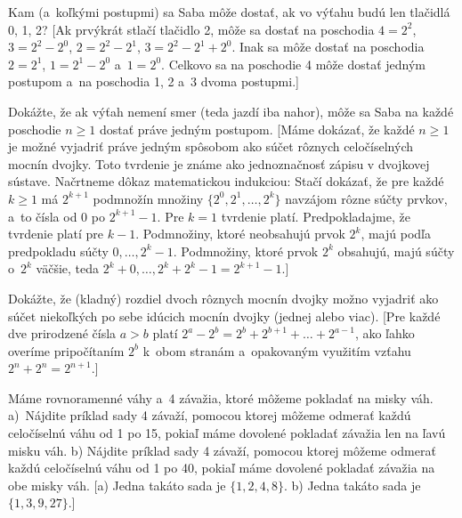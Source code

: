 {

Kam (a~koľkými postupmi) sa Saba môže dostať, ak vo výťahu budú len tlačidlá 0, 1, 2?
 [Ak prvýkrát stlačí tlačidlo 2, môže sa dostať na poschodia $4=2^2$, $3=2^2-2^0$, $2=2^2-2^1$, $3=2^2-2^1+2^0$. Inak sa môže dostať na poschodia $2=2^1$, $1=2^1-2^0$ a~$1=2^0$. Celkovo sa na poschodie 4 môže dostať jedným postupom a~na poschodia 1, 2 a~3 dvoma postupmi.]

Dokážte, že ak výťah nemení smer (teda jazdí iba nahor), môže sa Saba na každé poschodie $n\ge 1$ dostať práve jedným postupom.
 [Máme dokázať, že každé $n\ge 1$ je možné vyjadriť práve jedným spôsobom ako súčet rôznych celočíselných mocnín dvojky. Toto tvrdenie je známe ako jednoznačnosť zápisu v dvojkovej sústave. Načrtneme dôkaz matematickou indukciou: Stačí dokázať, že pre každé $k\ge 1$ má $2^{k+1}$ podmnožín množiny $\{2^0,2^1,\dots,2^k\}$ navzájom rôzne súčty prvkov, a~to čísla od 0 po $2^{k+1}-1$. Pre $k=1$ tvrdenie platí. Predpokladajme, že tvrdenie platí pre $k-1$. Podmnožiny, ktoré neobsahujú prvok $2^k$, majú podľa predpokladu súčty $0,\dots,2^k-1$. Podmnožiny, ktoré prvok $2^k$ obsahujú, majú súčty o~$2^k$ väčšie, teda $2^k+0,\dots,2^k+2^k-1=2^{k+1}-1$.]

Dokážte, že (kladný) rozdiel dvoch rôznych mocnín dvojky možno vyjadriť ako súčet niekoľkých po sebe idúcich mocnín dvojky (jednej alebo viac).
 [Pre každé dve prirodzené čísla $a>b$ platí $2^a-2^b = 2^b+2^{b+1}+\dots+2^{a-1}$, ako ľahko overíme pripočítaním $2^b$ k~obom stranám a~opakovaným využitím vzťahu $2^n+2^n=2^{n+1}$.]

\D

Máme rovnoramenné váhy a~4 závažia, ktoré môžeme pokladať na misky váh. a)~Nájdite príklad sady 4 závaží, pomocou ktorej môžeme odmerať každú celočíselnú váhu od 1 po 15, pokiaľ máme dovolené pokladať závažia len na ľavú misku váh. b) Nájdite príklad sady 4 závaží, pomocou ktorej môžeme odmerať každú celočíselnú váhu od 1 po 40, pokiaľ máme dovolené pokladať závažia na obe misky váh.
 [a) Jedna takáto sada je $\{1,2,4,8\}$. b) Jedna takáto sada je $\{1,3,9,27\}$.]

}
